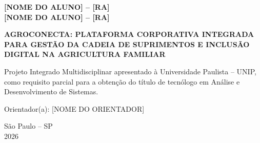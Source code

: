 \begin{titlepage}
  \begin{center}
    \fontsize{12}{18}\selectfont
    \textbf{[NOME DO ALUNO] -- [RA]}\\[0.25\baselineskip]
    \textbf{[NOME DO ALUNO] -- [RA]}

    \vspace{2.6cm}

    {\fontsize{14}{21}\selectfont\bfseries
      AGROCONECTA: PLATAFORMA CORPORATIVA INTEGRADA PARA GESTÃO DA CADEIA
      DE SUPRIMENTOS E INCLUSÃO DIGITAL NA AGRICULTURA FAMILIAR\par}

    \vspace{2.5cm}
  \end{center}

  \noindent\hspace*{5.5cm}%
  \begin{minipage}{9.5cm}
    \raggedright
    \fontsize{11}{16}\selectfont
    Projeto Integrado Multidisciplinar apresentado à Universidade Paulista --
    UNIP, como requisito parcial para a obtenção do título de tecnólogo em
    Análise e Desenvolvimento de Sistemas.

    \vspace{0.6\baselineskip}
    Orientador(a): [NOME DO ORIENTADOR]
  \end{minipage}

  \vfill
  \begin{center}
    \fontsize{12}{18}\selectfont
    São Paulo -- SP\\
    2026
  \end{center}
\end{titlepage}

\setcounter{page}{3}
\pagestyle{vazio}
\begingroup
{}

